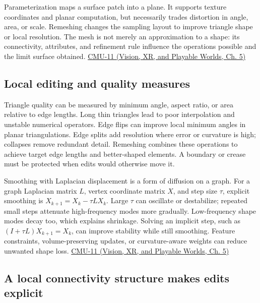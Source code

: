 Parameterization maps a surface patch into a plane. It supports texture coordinates and planar computation, but necessarily trades distortion in angle, area, or scale. Remeshing changes the sampling layout to improve triangle shape or local resolution. The mesh is not merely an approximation to a shape: its connectivity, attributes, and refinement rule influence the operations possible and the limit surface obtained. \href{../07-Vision-XR-and-Playable-Worlds/main.pdf\#nameddest=04-visual-computing-ii-ch036-cmu-11---digital-geometry-processing}{CMU-11 (Vision, XR, and Playable Worlds, Ch. 5)}

\subsection{Local editing and quality measures}\label{03-visual-computing-i-ch002-local-editing-and-quality-measures}

Triangle quality can be measured by minimum angle, aspect ratio, or area relative to edge lengths. Long thin triangles lead to poor interpolation and unstable numerical operators. Edge flips can improve local minimum angles in planar triangulations. Edge splits add resolution where error or curvature is high; collapses remove redundant detail. Remeshing combines these operations to achieve target edge lengths and better-shaped elements. A boundary or crease must be protected when edits would otherwise move it.

Smoothing with Laplacian displacement is a form of diffusion on a graph. For a graph Laplacian matrix \(L\), vertex coordinate matrix \(X\), and step size \(\tau\), explicit smoothing is \(X_{k+1}=X_k-\tau LX_k\). Large \(\tau\) can oscillate or destabilize; repeated small steps attenuate high-frequency modes more gradually. Low-frequency shape modes decay too, which explains shrinkage. Solving an implicit step, such as \((I+\tau L)X_{k+1}=X_k\), can improve stability while still smoothing. Feature constraints, volume-preserving updates, or curvature-aware weights can reduce unwanted shape loss. \href{../07-Vision-XR-and-Playable-Worlds/main.pdf\#nameddest=04-visual-computing-ii-ch036-cmu-11---digital-geometry-processing}{CMU-11 (Vision, XR, and Playable Worlds, Ch. 5)}

\subsection{A local connectivity structure makes edits explicit}\label{03-visual-computing-i-ch002-a-local-connectivity-structure-makes-edits-explicit}

